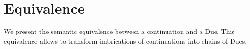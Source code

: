 \section{Equivalence} \label{section:equivalence}

We present the semantic equivalence between a continuation and a Due.
This equivalence allows to transform imbrications of continuations into chains of Dues.






